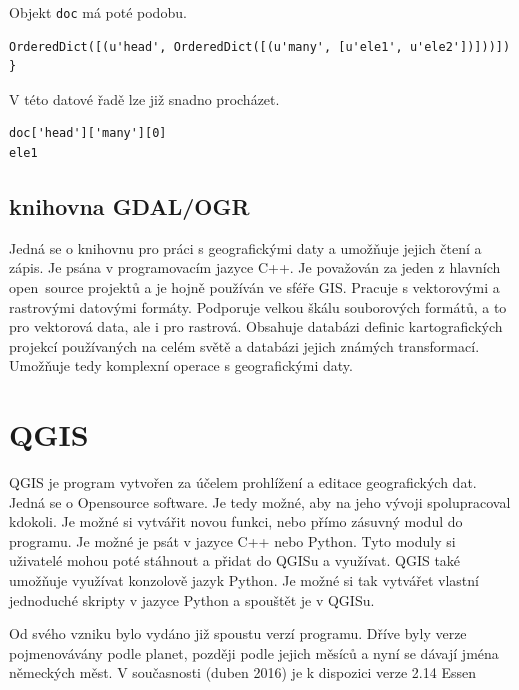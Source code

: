 Objekt {\tt doc} má poté podobu.

{\scriptsize
\lstset{language=Python}
\begin{lstlisting}
OrderedDict([(u'head', OrderedDict([(u'many', [u'ele1', u'ele2'])]))]) }
\end{lstlisting}
}

V této datové řadě lze již snadno procházet. 

{\scriptsize
\lstset{language=Python}
\begin{lstlisting}
doc['head']['many'][0]
ele1
\end{lstlisting}
}


\subsection{knihovna GDAL/OGR}
\label{GDAL/OGR}
Jedná se o knihovnu pro práci s geografickými daty a umožňuje jejich čtení a zápis.
Je psána v programovacím jazyce C++. Je považován za jeden z hlavních 
open~source projektů a je hojně používán ve sféře GIS. Pracuje s vektorovými a 
rastrovými datovými formáty. Podporuje velkou škálu souborových formátů, a to 
pro vektorová data, ale i pro rastrová. Obsahuje databázi definic kartografických
projekcí používaných na celém světě a databázi jejich známých transformací. 
Umožňuje tedy komplexní operace s geografickými daty. \cite{GDAL}


\section{QGIS}
\label{QGIS}
QGIS je program vytvořen za účelem prohlížení a editace geografických dat.
Jedná se o Opensource software. Je tedy možné, aby na jeho vývoji spolupracoval
kdokoli. Je možné si vytvářit novou funkci, nebo přímo zásuvný modul do programu.
Je možné je psát v jazyce C++ nebo Python.
Tyto moduly si uživatelé mohou poté stáhnout a přidat do QGISu a využívat.
QGIS také umožňuje využívat konzolově jazyk Python. Je možné si tak vytvářet
vlastní jednoduché skripty v jazyce Python a spouštět je v QGISu.

Od svého vzniku bylo vydáno již spoustu verzí programu.
Dříve byly verze pojmenovávány podle planet, později podle jejich měsíců a nyní se dávají
jména německých měst. V současnosti (duben 2016) je k dispozici verze 2.14 Essen
